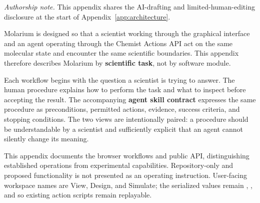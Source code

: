 \documentclass[11pt]{article}
\begin{document}
\newenvironment{skillcontract}[1]{%
  \par\nopagebreak[4]\vspace{2pt}%
  {\normalsize\bfseries Agent skill contract: \code{#1}}\par\vspace{1pt}%
  \footnotesize
  \begin{longtable}{@{}K V@{}}
  \toprule
  \textbf{Contract element} & \textbf{Requirement}\\
  \midrule
  \endfirsthead
  \toprule
  \textbf{Contract element} & \textbf{Requirement}\\
  \midrule
  \endhead
  \midrule
  \multicolumn{2}{r}{\footnotesize Continued on next page}\\
  \endfoot
  \bottomrule
  \endlastfoot
}{%
  \end{longtable}
  \small}
\newcommand{\contractrow}[2]{#1 & #2\\}

\newenvironment{smallcomparison}[1]{%
  \par\vspace{2pt}\footnotesize
  \begin{longtable}{@{}#1@{}}\toprule
}{%
  \bottomrule\end{longtable}
  \small}

\textit{Authorship note.} This appendix shares the AI-drafting and limited-human-editing disclosure at the start of Appendix~\ref{app:architecture}.

Molarium is designed so that a scientist working through the graphical interface and an agent operating through the Chemist Actions API act on the same molecular state and encounter the same scientific boundaries. This appendix therefore describes Molarium by \textbf{scientific task}, not by software module.

Each workflow begins with the question a scientist is trying to answer. The human procedure explains how to perform the task and what to inspect before accepting the result. The accompanying \textbf{agent skill contract} expresses the same procedure as preconditions, permitted actions, evidence, success criteria, and stopping conditions. The two views are intentionally paired: a procedure should be understandable by a scientist and sufficiently explicit that an agent cannot silently change its meaning.

This appendix documents the browser workflows and public API, distinguishing established operations from experimental capabilities. Repository-only and proposed functionality is not presented as an operating instruction. User-facing workspace names are View, Design, and Simulate; the serialized values remain , , and  so existing action scripts remain replayable.
\end{document}
